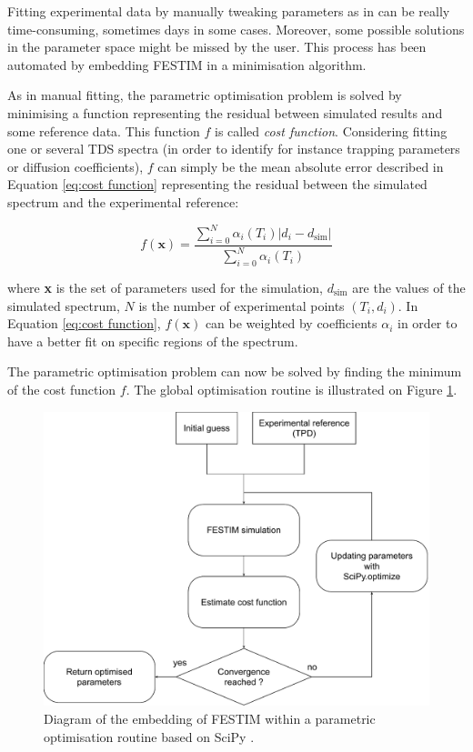 Fitting experimental data by manually tweaking parameters as in  can be really time-consuming, sometimes days in some cases.
Moreover, some possible solutions in the parameter space might be missed by the user.
This process has been automated by embedding FESTIM in a minimisation algorithm.

As in manual fitting, the parametric optimisation problem is solved by minimising a function representing the residual between simulated results and some reference data.
This function $f$ is called \textit{cost function}.
Considering fitting one or several TDS spectra (in order to identify for instance trapping parameters or diffusion coefficients), $f$ can simply be the mean absolute error described in Equation \ref{eq:cost function} representing the residual between the simulated spectrum and the experimental reference: 

\begin{equation}
    f(\textbf{x})=\frac{\sum_{i=0}^{N}  \alpha_i(T_i)\left| d_{i}-d_{\mathrm{sim}}\right|}{\sum_{i=0}^{N}  \alpha_i(T_i)}
    \label{eq:cost function}
\end{equation}

where \textbf{x} is the set of parameters used for the simulation, $d_\mathrm{sim}$ are the values of the simulated spectrum, $N$ is the number of experimental points $(T_i, d_i)$.
In Equation \ref{eq:cost function}, $f(\textbf{x})$ can be weighted by coefficients $\alpha_i$ in order to have a better fit on specific regions of the spectrum.

The parametric optimisation problem can now be solved by finding the minimum of the cost function $f$.
The global optimisation routine is illustrated on Figure \ref{fig:diagramm}.
\begin{figure}
    \centering
    \includegraphics[width=\linewidth]{Figures/Chapter3/Parametric_optimisation/algorithm diagram.pdf}
    \caption{Diagram of the embedding of FESTIM within a parametric optimisation routine based on SciPy \cite{virtanen_scipy_2020}.}
    \label{fig:diagramm}
\end{figure}

